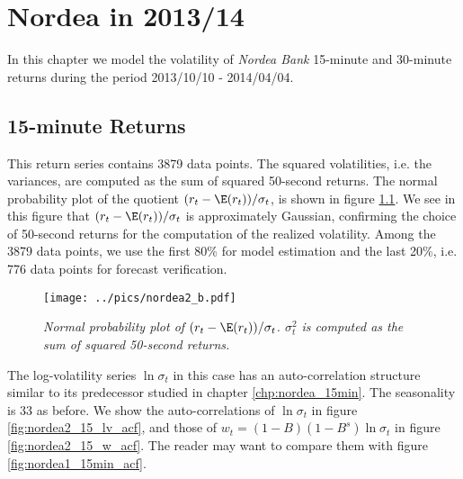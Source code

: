 \chapter{Nordea in 2013/14}
\label{chp:Nordea2}
In this chapter we model the volatility of {\it Nordea Bank}
15-minute and 30-minute returns during the period 2013/10/10 -
2014/04/04.

\section{15-minute Returns}\label{sec:nordea2_15min}
This return series contains 3879 data points. The squared
volatilities, i.e. the variances, are computed as the sum of squared
50-second returns. The normal probability plot of the quotient $(r_t - \E(r_t))/
\sigma_t$, is shown in figure \ref{fig:nordea2_b}. We see in this figure that
$(r_t - \E(r_t)) / \sigma_t$ is approximately Gaussian, confirming the choice of
50-second returns for the computation of the realized
volatility. Among the 3879 data points, we use the first 80\% for
model estimation and the last 20\%, i.e. 776 data points for forecast
verification.

\begin{figure}[htb!]
  \centering
  \texttt{[image: ../pics/nordea2\_b.pdf]}
  \caption{\small \it Normal probability plot of $(r_t - \E(r_t))/
    \sigma_t$. $\sigma_t^2$ is computed as the sum of squared
    50-second returns.}
  \label{fig:nordea2_b}
\end{figure}

The log-volatility series $\ln \sigma_t$ in this case has an
auto-correlation structure similar to its predecessor studied in
chapter \ref{chp:nordea_15min}. The seasonality is 33 as before. We
show the auto-correlations of $\ln \sigma_t$ in figure
\ref{fig:nordea2_15_lv_acf}, and those of $w_t = (1 - B)(1-B^s)\ln
\sigma_t$ in figure \ref{fig:nordea2_15_w_acf}. The reader may want to
compare them with figure \ref{fig:nordea1_15min_acf}.

